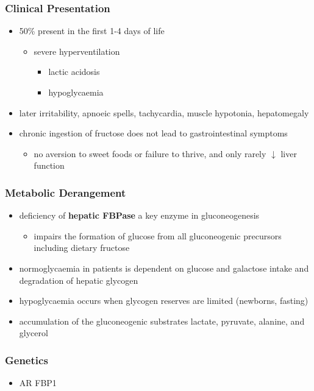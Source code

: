 \documentclass{scrartcl}
\begin{document}
\subsubsection{Clinical Presentation}
\label{sec:org62c2906}
\begin{itemize}
\item 50\% present in the first 1-4 days of life
\begin{itemize}
\item severe hyperventilation
\begin{itemize}
\item lactic acidosis
\item hypoglycaemia
\end{itemize}
\end{itemize}
\item later irritability, apnoeic spells, tachycardia, muscle hypotonia, hepatomegaly
\item chronic ingestion of fructose does not lead to gastrointestinal symptoms
\begin{itemize}
\item no aversion to sweet foods or failure to thrive, and only rarely \(\downarrow\) liver function
\end{itemize}
\end{itemize}

\subsubsection{Metabolic Derangement}
\label{sec:org6b235ec}
\begin{itemize}
\item deficiency of \textbf{hepatic FBPase} a key enzyme in gluconeogenesis
\begin{itemize}
\item impairs the formation of glucose from all gluconeogenic precursors including dietary fructose
\end{itemize}
\item normoglycaemia in patients is dependent on glucose and galactose
intake and degradation of hepatic glycogen
\item hypoglycaemia occurs when glycogen reserves are limited (newborns, fasting)
\item accumulation of the gluconeogenic substrates lactate, pyruvate, alanine, and glycerol
\end{itemize}
\subsubsection{Genetics}
\label{sec:org6547512}
\begin{itemize}
\item AR FBP1
\end{itemize}
\end{document}
